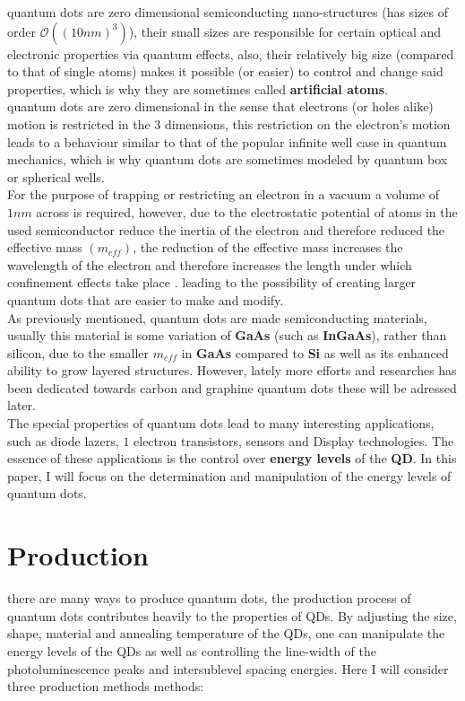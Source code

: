 \documentclass[twoside,11pt]{article}
\begin{document}
quantum dots are zero dimensional semiconducting nano-structures (has sizes of order $\mathcal{O}((10nm)^3)$), their small sizes are responsible for certain optical and electronic properties via quantum effects, also, their relatively big size (compared to that of single atoms) makes it possible (or easier) to control and change said properties, which is why they are sometimes called \textbf{artificial atoms}.\\
quantum dots are zero dimensional in the sense that electrons (or holes alike) motion is restricted in the 3 dimensions, this restriction on the electron's motion leads to a behaviour similar to that of the popular infinite well case in quantum mechanics, which is why quantum dots are sometimes modeled by quantum box or spherical wells.\\
For the purpose of trapping or restricting an electron in a vacuum a volume of $1nm$ across is required, however, due to the electrostatic potential of atoms in the used semiconductor reduce the inertia of the electron and therefore reduced the effective mass $(m_{eff})$, the reduction of the effective mass increases the wavelength of the electron and therefore increases the length under which confinement effects take place . leading to the possibility of creating larger quantum dots that are easier to make and modify. \cite{reed1993quantum}\\
As previously mentioned, quantum dots are made semiconducting materials, usually this material is some variation of \textbf{GaAs} (such as \textbf{InGaAs}), rather than silicon, due to the smaller $m_{eff}$ in \textbf{GaAs} compared to \textbf{Si} as well as its enhanced ability to grow  layered structures. However, lately more efforts and researches has been dedicated towards carbon and graphine quantum dots these will be adressed later.\cite{shur1989gallium}\\
The special properties of quantum dots lead to many interesting applications, such as diode lazers, $1$ electron transistors, sensors and Display technologies. The essence of these applications is the control over \textbf{energy levels} of the \textbf{QD}. In this paper, I will focus on the determination and manipulation of the energy levels of quantum dots.

\section{Production}
there are many ways to produce quantum dots, the production process of quantum dots contributes heavily to the properties of QDs. By adjusting the size, shape, material and annealing temperature of the QDs, one can manipulate the energy levels of the QDs as well as controlling the line-width of the photoluminescence peaks and intersublevel spacing energies. Here I will consider three production methods methods:
\end{document}
